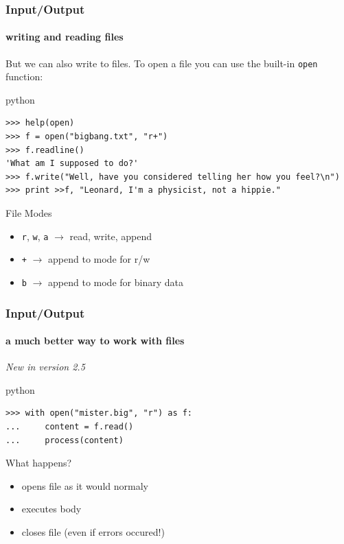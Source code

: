 \documentclass{beamer}
\begin{document}
\begin{frame}[fragile]
	\frametitle{Input/Output}
	\framesubtitle{writing and reading files}

	But we can also write to files. To open a file you can use the built-in \texttt{open} function:
	\begin{exampleblock}{python}
	\begin{lstlisting}
>>> help(open)
>>> f = open("bigbang.txt", "r+")
>>> f.readline()
'What am I supposed to do?'
>>> f.write("Well, have you considered telling her how you feel?\n")
>>> print >>f, "Leonard, I'm a physicist, not a hippie."
	\end{lstlisting}
	\end{exampleblock}

\pause
	
	\begin{block}{File Modes}
	\begin{itemize}
		\item \texttt{r}, \texttt{w}, \texttt{a} $ \rightarrow $ read, write, append
		\item \texttt{+} $ \rightarrow $ append to mode for r/w
		\item \texttt{b} $ \rightarrow $ append to mode for binary data
	\end{itemize}
	\end{block}
\end{frame}

\begin{frame}[fragile]
	\frametitle{Input/Output}
	\framesubtitle{a much better way to work with files}
	\emph{New in version 2.5}
	\begin{exampleblock}{python}
	\begin{lstlisting}
>>> with open("mister.big", "r") as f:
...     content = f.read()
...     process(content)
	\end{lstlisting}
	\end{exampleblock}

\pause

	\begin{block}{What happens?}
	\begin{itemize}
		\item opens file as it would normaly
		\item executes body
		\item closes file (even if errors occured!)
	\end{itemize}
	\end{block}
\end{frame}
\end{document}
